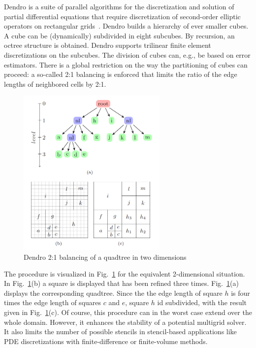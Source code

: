 \documentclass[11pt,pdftex]{article}
\begin{document}
\textsf{Dendro} is a suite of parallel algorithms for the discretization
and solution of partial differential equations that require
discretization of second-order elliptic operators on rectangular
grids~\cite{ssad:07, sasl:08, sabi:10, ssal:09}.  \textsf{Dendro} builds
a hierarchy of ever smaller cubes.  A cube can be (dynamically)
subdivided in eight subcubes.  By recursion, an octree structure is
obtained.  \textsf{Dendro} supports trilinear finite element
discretizations on the subcubes.  The division of cubes can, e.g., be
based on error estimators.  There is a global restriction on the way the
partitioning of cubes can proceed: a so-called 2:1 balancing is enforced
that limits the ratio of the edge lengths of neighbored cells by 2:1.
\begin{figure}[h]
  \centering
  \includegraphics[width=0.65\textwidth]{figures/quadtree.png}  
  \caption{\textsf{Dendro} 2:1 balancing of a quadtree in two
    dimensions~\cite{sasl:08}}
  \label{fig:dendro}
\end{figure}
The procedure is visualized in Fig.~\ref{fig:dendro} for the equivalent
2-dimensional situation.  In Fig.~\ref{fig:dendro}(b) a square is
displayed that has been refined three times.  Fig.~\ref{fig:dendro}(a)
displays the corresponding quadtree.  Since the the edge length of
square $h$ is four times the edge length of squares $c$ and $e$, square
$h$ id subdivided, with the result given in Fig.~\ref{fig:dendro}(c).
Of course, this procedure can in the worst case extend over the whole
domain.  However, it enhances the stability of a potential multigrid
solver.  It also limits the number of possible stencils in stencil-based
applications like PDE discretizations with finite-difference or
finite-volume methods.
\end{document}

